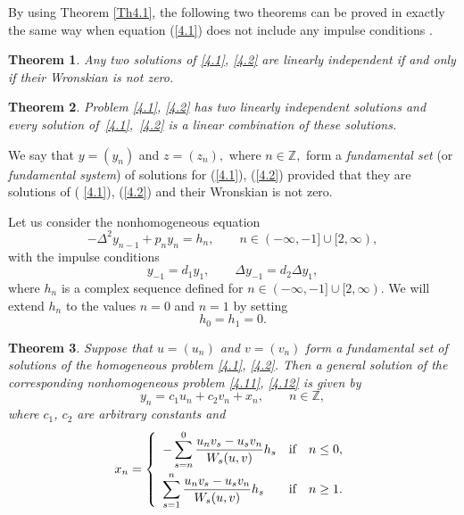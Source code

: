 \documentclass[11pt]{article}
\newtheorem{theorem}{Theorem}
\numberwithin{equation}{section}
\begin{document}
By using Theorem \ref{Th4.1}, the following two theorems can be proved in
exactly the same way when equation (\ref{4.1}) does not include any impulse
conditions \cite{[6]}.

\begin{theorem}
\label{Th4.5}Any two solutions of \eqref{4.1}, \eqref{4.2} are linearly
independent if and only if their Wronskian is not zero.
\end{theorem}

\begin{theorem}
\label{Th4.6}Problem \eqref{4.1}, \eqref{4.2} has two linearly independent
solutions and every solution of~\eqref{4.1},~\eqref{4.2} is a linear
combination of these solutions.
\end{theorem}

We say that $y=(y_{n})$ and $z=(z_{n}),$ where $n\in
\mathbb{Z}
,$ form a \textit{fundamental set }(or \textit{fundamental system}) of
solutions for (\ref{4.1}), (\ref{4.2}) provided that they are solutions of (%
\ref{4.1}), (\ref{4.2}) and their Wronskian is not zero.

Let us consider the nonhomogeneous equation%
\begin{equation}
-\Delta ^{2}y_{n-1}+p_{n}y_{n}=h_{n},\qquad n\in (-\infty ,-1]\cup
\lbrack 2,\infty ),  \label{4.11}
\end{equation}%
with the impulse conditions%
\begin{equation}
y_{-1}=d_{1}y_{1},\qquad \Delta y_{-1}=d_{2}\Delta y_{1},  \label{4.12}
\end{equation}%
where $h_{n}$ is a complex sequence def\/ined for $n\in (-\infty ,-1]\cup
\lbrack 2,\infty ).$ We will extend $h_{n}$ to the values $n=0$ and $n=1$ by
setting%
\begin{equation}
h_{0}=h_{1}=0.  \label{4.13}
\end{equation}

\begin{theorem}
\label{Th4.7}Suppose that $u=(u_{n})$ and $v=(v_{n})$ form a fundamental set
of solutions of the homogeneous problem \eqref{4.1}, \eqref{4.2}. Then a
general solution of the corresponding nonhomogeneous problem \eqref{4.11}, \eqref{4.12} is given by%
\[
y_{n}=c_{1}u_{n}+c_{2}v_{n}+x_{n},\qquad n\in
\mathbb{Z},
\]%
where $c_{1}$, $c_{2}$ are arbitrary constants and%
\begin{equation}
x_{n}=\left\{
\begin{array}{lll}
\displaystyle -\sum_{s=n}^{0}\frac{u_{n}v_{s}-u_{s}v_{n}}{W_{s}(u,v)}h_{s} & \text{if} &
n\leq 0, \vspace{1mm} \\
\displaystyle \sum_{s=1}^{n}\frac{u_{n}v_{s}-u_{s}v_{n}}{W_{s}(u,v)}h_{s} & \text{if} &
n\geq 1.%
\end{array}%
\right.  \label{4.14}
\end{equation}
\end{theorem}
\end{document}
